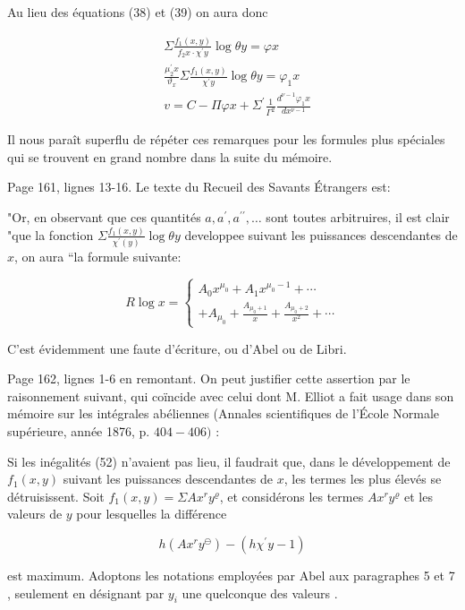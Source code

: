\documentclass{article}
\begin{document}
Au lieu des équations (38) et (39) on aura donc

\[
\begin{aligned}
& \Sigma \frac{f_{1}(x, y)}{f_{2} x \cdot \chi^{\prime} y} \log \theta y=\varphi x \\
& \frac{\mu_{2}^{\prime} x}{\vartheta_{x}} \Sigma \frac{f_{1}(x, y)}{\chi^{\prime} y} \log \theta y=\varphi_{1} x \\
& v=C-\Pi \varphi x+\Sigma^{\prime} \frac{1}{\Gamma^{2}} \frac{d^{\nu-1} \varphi_{1} x}{d x^{\nu-1}}
\end{aligned}
\]

Il nous paraît superflu de répéter ces remarques pour les formules plus spéciales qui se trouvent en grand nombre dans la suite du mémoire.

Page 161, lignes 13-16. Le texte du Recueil des Savants Étrangers est:

"Or, en observant que ces quantités \(a, a^{\prime}, a^{\prime \prime}, \ldots\) sont toutes arbitruires, il est clair "que la fonction \(\Sigma \frac{f_{1}(x, y)}{\chi^{\prime}(y)} \log \theta y\) developpee suivant les puissances descendantes de \(x\), on aura “la formule suivante:

\[
R \log x=\left\{\begin{array}{c}
A_{0} x^{\mu_{0}}+A_{1} x^{\mu_{0}-1}+\cdots \\
+A_{\mu_{0}}+\frac{A_{\mu_{0}+1}}{x}+\frac{A_{\mu_{0}+2}}{x^{2}}+\cdots
\end{array}\right.
\]

C'est évidemment une faute d'écriture, ou d'Abel ou de Libri.

Page 162, lignes 1-6 en remontant. On peut justifier cette assertion par le raisonnement suivant, qui coïncide avec celui dont M. Elliot a fait usage dans son mémoire sur les intégrales abéliennes (Annales scientifiques de l'École Normale supérieure, année 1876, p. \(404-406)\) :

\(\mathrm{Si}\) les inégalités (52) n'avaient pas lieu, il faudrait que, dans le développement de \(f_{1}(x, y)\) suivant les puissances descendantes de \(x\), les termes les plus élevés se détruisissent. Soit \(f_{1}(x, y)=\Sigma A x^{r} y^{\varrho}\), et considérons les termes \(A x^{r} y^{\varrho}\) et les valeurs de \(y\) pour lesquelles la différence

\[
h\left(A x^{r} y^{\ominus}\right)-\left(h \chi^{\prime} y-1\right)
\]

est maximum. Adoptons les notations employées par Abel aux paragraphes 5 et 7 , seulement en désignant par \(y_{i}\) une quelconque des valeurs .
\end{document}
